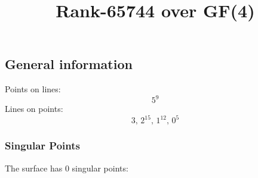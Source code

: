 \documentclass{article}
\newcommand\setTBstruts{\def\T{\rule{0pt}{2.6ex}}%
\def\B{\rule[-1.2ex]{0pt}{0pt}}}
\begin{document}
 
\setTBstruts



{\allowdisplaybreaks%






\title{Rank-65744 over GF(4)}
\author{}%
\maketitle%
%
{}



\subsection*{General information}
Points on lines:
$$
5^9$$
Lines on points:
$$
3,\,2^{15},\,1^{12},\,0^5$$
\subsubsection*{Singular Points}
The surface has 0 singular points:\\
\begin{align*}
\end{align*}
}
\end{document}
